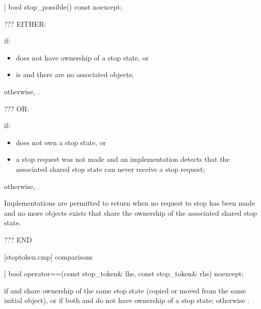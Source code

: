 {\begin{itemdescr}
\end{itemdescr}

%
\begin{itemdecl}
[[nodiscard]] bool stop_possible() const noexcept;
\end{itemdecl}
\begin{itemdescr}

  {\color{blue} ??? EITHER: }

  \pnum\returns {} if:
  \begin{itemize}
   \item {} does not have ownership of a stop state, or
   \item {} is  and there are no associated  objects;
  \end{itemize}
        otherwise, .

  {\color{blue} ??? OR: }
  
  \pnum\returns {} if:
  \begin{itemize}
   \item {} does not own a stop state, or
   \item a stop request was not made and 
         an implementation detects that the associated shared stop state can never receive a stop request;
  \end{itemize}
        otherwise, .
                \begin{note} Implementations are permitted to return  when no request to stop
                     has been made and no more 
                     objects exists that share the ownership of the associated shared stop state.
                \end{note}

  {\color{blue} ??? END }
\end{itemdescr}


[stoptoken.cmp]{ comparisons}

%
\begin{itemdecl}
[[nodiscard]] bool operator==(const stop_token& lhs, const stop_token& rhs) noexcept;
\end{itemdecl}
\begin{itemdescr}
  \pnum\returns {} if  and  share ownership
                of the same stop state
                (copied or moved from the same initial  object),
                or if both  and  do not have ownership of a stop state;
                otherwise .
\end{itemdescr}

}
